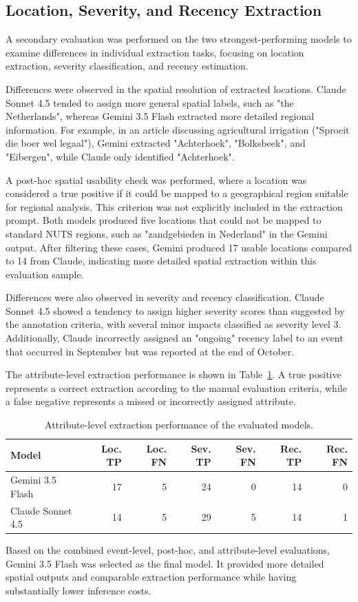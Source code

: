 \subsection{Location, Severity, and Recency Extraction}

A secondary evaluation was performed on the two strongest-performing models to examine differences in individual extraction tasks, focusing on location extraction, severity classification, and recency estimation.

Differences were observed in the spatial resolution of extracted locations. Claude Sonnet 4.5 tended to assign more general spatial labels, such as "the Netherlands", whereas Gemini 3.5 Flash extracted more detailed regional information. For example, in an article discussing agricultural irrigation ("Sproeit die boer wel legaal"), Gemini extracted "Achterhoek", "Bolksbeek", and "Eibergen", while Claude only identified "Achterhoek".

A post-hoc spatial usability check was performed, where a location was considered a true positive if it could be mapped to a geographical region suitable for regional analysis. This criterion was not explicitly included in the extraction prompt. Both models produced five locations that could not be mapped to standard NUTS regions, such as "zandgebieden in Nederland" in the Gemini output. After filtering these cases, Gemini produced 17 usable locations compared to 14 from Claude, indicating more detailed spatial extraction within this evaluation sample.

Differences were also observed in severity and recency classification. Claude Sonnet 4.5 showed a tendency to assign higher severity scores than suggested by the annotation criteria, with several minor impacts classified as severity level 3. Additionally, Claude incorrectly assigned an "ongoing" recency label to an event that occurred in September but was reported at the end of October.

The attribute-level extraction performance is shown in Table~\ref{tab:extraction_performance}. A true positive represents a correct extraction according to the manual evaluation criteria, while a false negative represents a missed or incorrectly assigned attribute.

\begin{table}[htbp] 
\centering 
\caption{Attribute-level extraction performance of the evaluated models.} 
\label{tab:extraction_performance} 
\begin{tabular}{lrrrrrr} 
\toprule 
Model & Loc. TP & Loc. FN & Sev. TP & Sev. FN & Rec. TP & Rec. FN \\
\midrule 
Gemini 3.5 Flash & 17 & 5 & 24 & 0 & 14 & 0 \\
Claude Sonnet 4.5 & 14 & 5 & 29 & 5 & 14 & 1 \\
\bottomrule 
\end{tabular} 
\end{table}

Based on the combined event-level, post-hoc, and attribute-level evaluations, Gemini 3.5 Flash was selected as the final model. It provided more detailed spatial outputs and comparable extraction performance while having substantially lower inference costs.
